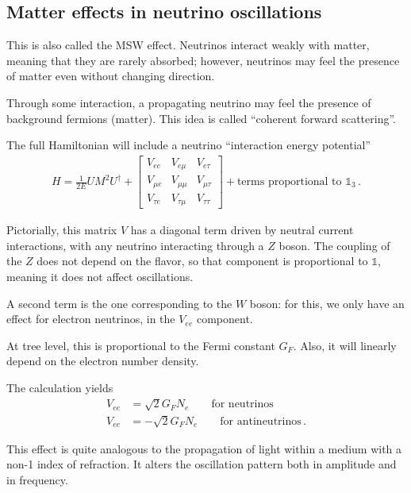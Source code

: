 \documentclass[main.tex]{subfiles}
\begin{document}
\subsection{Matter effects in neutrino oscillations}


This is also called the MSW effect. 
Neutrinos interact weakly with matter, meaning that they are rarely absorbed;
however, neutrinos may feel the presence of matter even without changing direction. 

Through some interaction, a propagating neutrino may feel the presence of background fermions (matter).
This idea is called ``coherent forward scattering''. 

The full Hamiltonian will include a neutrino ``interaction energy potential''
%
\begin{align}
H = \frac{1}{2E} U M^2 U ^\dag + \left[\begin{array}{ccc}
V_{ee} & V_{e \mu } & V_{e \tau } \\ 
V_{\mu e} & V_{\mu \mu } & V_{\mu \tau } \\ 
V_{\tau e} & V_{\tau \mu } & V_{\tau \tau }
\end{array}\right]
+ \text{terms proportional to } \mathbb{1}_3
\,.
\end{align}

Pictorially, this matrix \(V\) has a diagonal term driven by neutral current interactions,
with any neutrino interacting through a \(Z\) boson. 
The coupling of the \(Z\) does not depend on the flavor, so that component is 
proportional to \(\mathbb{1}\), meaning it does not affect oscillations. 

A second term is the one corresponding to the \(W\) boson: for this, we only have
an effect for electron neutrinos, in the \(V_{ee}\) component. 

At tree level, this is proportional to the Fermi constant \(G_F\). 
Also, it will linearly depend on the electron number density. 

The calculation yields 
%
\begin{align}
V_{ee} &= \sqrt{2} G_F N_e 
\qquad \text{for neutrinos}  \\
V_{ee} &= -\sqrt{2} G_F N_e 
\qquad \text{for antineutrinos}  
\,.
\end{align}

This effect is quite analogous to the propagation of light within a medium with a 
non-1 index of refraction. 
It alters the oscillation pattern both in amplitude and in frequency.
\end{document}
